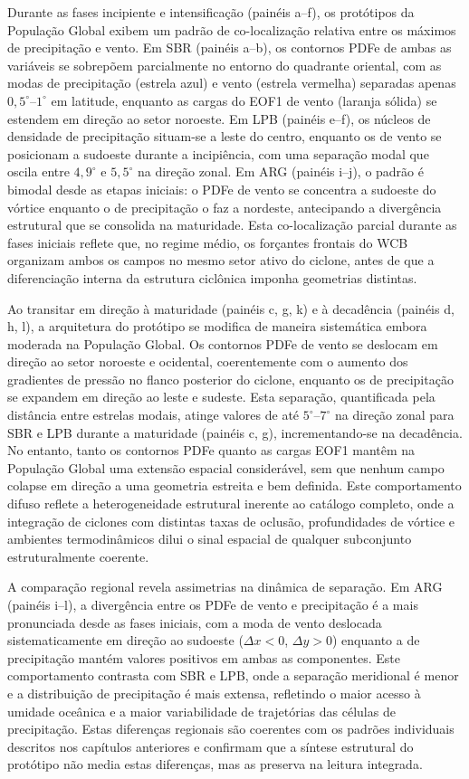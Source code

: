 Durante as fases incipiente e intensificação (painéis a--f), os protótipos da População Global exibem um padrão de co-localização relativa entre os máximos de precipitação e vento. Em SBR (painéis a--b), os contornos PDFe de ambas as variáveis se sobrepõem parcialmente no entorno do quadrante oriental, com as modas de precipitação (estrela azul) e vento (estrela vermelha) separadas apenas $0{,}5^{\circ}$--$1^{\circ}$ em latitude, enquanto as cargas do EOF1 de vento (laranja sólida) se estendem em direção ao setor noroeste. Em LPB (painéis e--f), os núcleos de densidade de precipitação situam-se a leste do centro, enquanto os de vento se posicionam a sudoeste durante a incipiência, com uma separação modal que oscila entre $4{,}9^{\circ}$ e $5{,}5^{\circ}$ na direção zonal. Em ARG (painéis i--j), o padrão é bimodal desde as etapas iniciais: o PDFe de vento se concentra a sudoeste do vórtice enquanto o de precipitação o faz a nordeste, antecipando a divergência estrutural que se consolida na maturidade. Esta co-localização parcial durante as fases iniciais reflete que, no regime médio, os forçantes frontais do WCB organizam ambos os campos no mesmo setor ativo do ciclone, antes de que a diferenciação interna da estrutura ciclônica imponha geometrias distintas.

Ao transitar em direção à maturidade (painéis c, g, k) e à decadência (painéis d, h, l), a arquitetura do protótipo se modifica de maneira sistemática embora moderada na População Global. Os contornos PDFe de vento se deslocam em direção ao setor noroeste e ocidental, coerentemente com o aumento dos gradientes de pressão no flanco posterior do ciclone, enquanto os de precipitação se expandem em direção ao leste e sudeste. Esta separação, quantificada pela distância entre estrelas modais, atinge valores de até $5^{\circ}$--$7^{\circ}$ na direção zonal para SBR e LPB durante a maturidade (painéis c, g), incrementando-se na decadência. No entanto, tanto os contornos PDFe quanto as cargas EOF1 mantêm na População Global uma extensão espacial considerável, sem que nenhum campo colapse em direção a uma geometria estreita e bem definida. Este comportamento difuso reflete a heterogeneidade estrutural inerente ao catálogo completo, onde a integração de ciclones com distintas taxas de oclusão, profundidades de vórtice e ambientes termodinâmicos dilui o sinal espacial de qualquer subconjunto estruturalmente coerente.

A comparação regional revela assimetrias na dinâmica de separação. Em ARG (painéis i--l), a divergência entre os PDFe de vento e precipitação é a mais pronunciada desde as fases iniciais, com a moda de vento deslocada sistematicamente em direção ao sudoeste ($\Delta x < 0$, $\Delta y > 0$) enquanto a de precipitação mantém valores positivos em ambas as componentes. Este comportamento contrasta com SBR e LPB, onde a separação meridional é menor e a distribuição de precipitação é mais extensa, refletindo o maior acesso à umidade oceânica e a maior variabilidade de trajetórias das células de precipitação. Estas diferenças regionais são coerentes com os padrões individuais descritos nos capítulos anteriores e confirmam que a síntese estrutural do protótipo não media estas diferenças, mas as preserva na leitura integrada.

